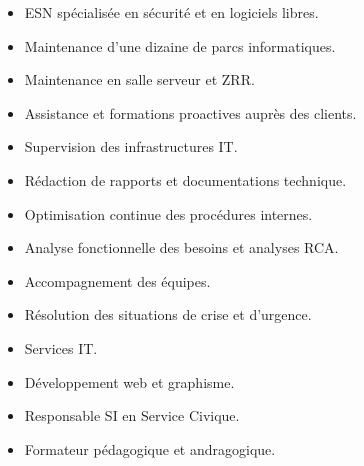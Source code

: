 \documentclass[10pt,a4paper,ragged2e,withhyper,normalphoto]{altacv}
\begin{document}
\begin{paracol}{2}


\begin{itemize}
\item ESN spécialisée en sécurité et en logiciels libres.
\item Maintenance d’une dizaine de parcs informatiques.
\item Maintenance en salle serveur et ZRR.
\item Assistance et formations proactives auprès des clients.
\item Supervision des infrastructures IT.
\item Rédaction de rapports et documentations technique.
\item Optimisation continue des procédures internes.
\item Analyse fonctionnelle des besoins et analyses RCA.
\item Accompagnement des équipes.
\item Résolution des situations de crise et d’urgence.
\end{itemize}

\divider

\begin{itemize}
\item Services IT.
\item Développement web et graphisme.
\end{itemize}

\divider

\begin{itemize}
\item Responsable SI en Service Civique.
\end{itemize}

\divider

\switchcolumn

\bigskip \bigskip \bigskip \bigskip

\begin{itemize}
\item Formateur pédagogique et andragogique.
\end{itemize}

\divider



\end{paracol}
\end{document}
